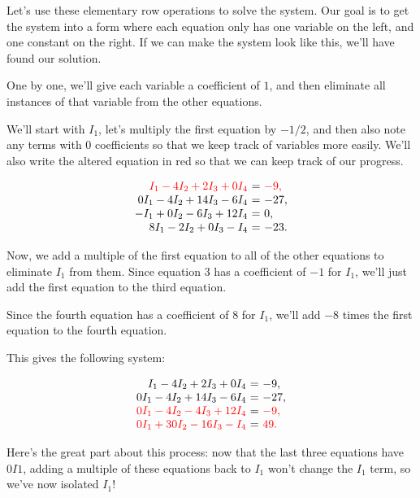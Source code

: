 \documentclass{ximera}
\begin{document}
\begin{exploration}
\begin{example}
\begin{solution}
\begin{remark}
  \end{remark}

  Let's use these elementary row operations to solve the system. Our goal is to get the system into a form where each equation only has one variable on the left, and one constant on the right. If we can make the system look like this, we'll have found our solution.

  One by one, we'll give each variable a coefficient of $1$, and then eliminate all instances of that variable from the other equations. 
  
  We'll start with $I_1$, let's multiply the first equation by $-1/2$, and then also note any terms with $0$ coefficients so that we keep track of variables more easily. We'll also write the altered equation in red so that we can keep track of our progress.

  \begin{equation*}
    \begin{array}{r@{~}c@{~}l}
      \color{red}I_1-4I_2+2I_3+0I_4&=&\color{red}-9, \\
      0I_1- 4I_2 + 14I_3 - 6I_4 &=& -27, \\
      -I_1 +0I_2 - 6I_3 + 12I_4 &=& 0, \\
      8I_1-2I_2 +0I_3 - I_4 &=& -23.
    \end{array}
  \end{equation*}

  Now, we add a multiple of the first equation to all of the other equations to eliminate $I_1$ from them. Since equation 3 has a coefficient of $-1$ for $I_1$, we'll just add the first equation to the third equation. 

  Since the fourth equation has a coefficient of $8$ for $I_1$, we'll add $-8$ times the first equation to the fourth equation.

  This gives the following system:

  \begin{equation*}
    \begin{array}{r@{~}c@{~}l}
      I_1-4I_2+2I_3+0I_4&=&-9, \\
      0I_1- 4I_2 + 14I_3 - 6I_4 &=& -27, \\
      \color{red}0I_1 - 4I_2 - 4I_3 + 12I_4 &=& \color{red}-9, \\
      \color{red}0I_1+30I_2 - 16I_3 - I_4 &=& \color{red}49.
    \end{array}
  \end{equation*}

  Here's the great part about this process: now that the last three equations have $0I1$, adding a multiple of these equations back to $I_1$ won't change the $I_1$ term, so we've now isolated $I_1$!


\end{solution}
\end{example}
\end{exploration}
\end{document}
